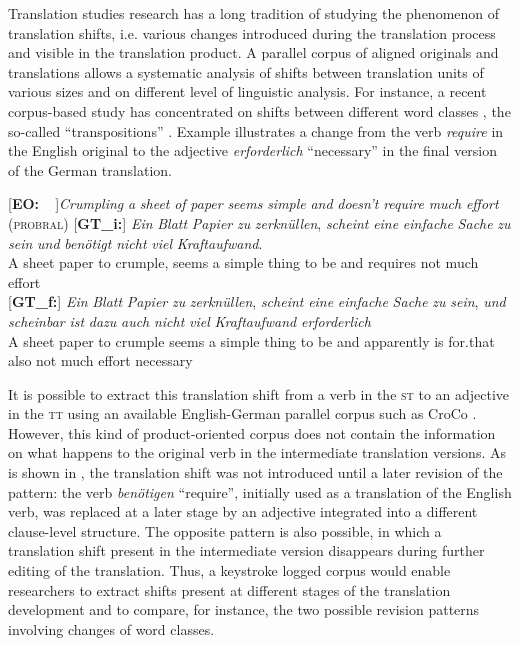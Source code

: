 \documentclass[output=paper]{LSP/langsci}
\begin{document}
Translation studies research has a long tradition of studying the phenomenon of translation shifts, i.e. various changes introduced during the translation process and visible in the translation product. A parallel corpus of aligned originals and translations allows a systematic analysis of shifts between translation units of various sizes and on different level of linguistic analysis. For instance, a recent corpus-based study has concentrated on shifts between different word classes \citep{Culo2008}, the so-called “transpositions” \citep[36]{Vinay1995/1958}. Example  illustrates a change from the verb \textit{require} in the English original to the adjective \textit{erforderlich} “necessary” in the final version of the German translation. 

\ea \label{ex:1:8}
\begin{xlist}
\exi{}[\textbf{EO:~~}]{\emph{Crumpling} \emph{a} \emph{sheet} \emph{of} \emph{paper} \emph{seems} \emph{simple} \emph{and} \emph{doesn't} \emph{require} \emph{much} \emph{effort} (\textsc{probral})}
\exi{}[\textbf{GT\_i:}]{
\gll \emph{Ein} \emph{Blatt} \emph{Papier} \emph{zu} \emph{zerknüllen}, \emph{scheint} \emph{eine} \emph{einfache} \emph{Sache} \emph{zu} \emph{sein} \emph{und} \emph{benötigt} \emph{nicht} \emph{viel} \emph{Kraftaufwand}.\\
  A sheet paper to crumple, seems a simple thing to be and requires not much effort\\
}
\exi{}[\textbf{GT\_f:}]{
\gll \emph{Ein}   \emph{Blatt} \emph{Papier} \emph{zu} \emph{zerknüllen}, \emph{scheint} \emph{eine} \emph{einfache} \emph{Sache} \emph{zu} \emph{sein}, \emph{und} \emph{scheinbar} \emph{ist} \emph{dazu} \emph{auch} \emph{nicht} \emph{viel} \emph{Kraftaufwand} \emph{erforderlich}\\
A sheet paper to crumple seems a simple thing to be and apparently is for.that also not much effort necessary\\
}
\end{xlist}
\z

It is possible to extract this translation shift from a verb in the \textsc{st} to an adjective in the \textsc{tt} using an available English-German parallel corpus such as CroCo \citep{Hansen-Schirra2012}. However, this kind of product-oriented corpus does not contain the information on what happens to the original verb in the intermediate translation versions. As is shown in , the translation shift was not introduced until a later revision of the pattern: the verb \textit{benötigen} “require”, initially used as a translation of the English verb, was replaced at a later stage by an adjective integrated into a different clause-level structure. The opposite pattern is also possible, in which a translation shift present in the intermediate version disappears during further editing of the translation. Thus, a keystroke logged corpus would enable researchers to extract shifts present at different stages of the translation development and to compare, for instance, the two possible revision patterns involving changes of word classes.
  
\end{document}
